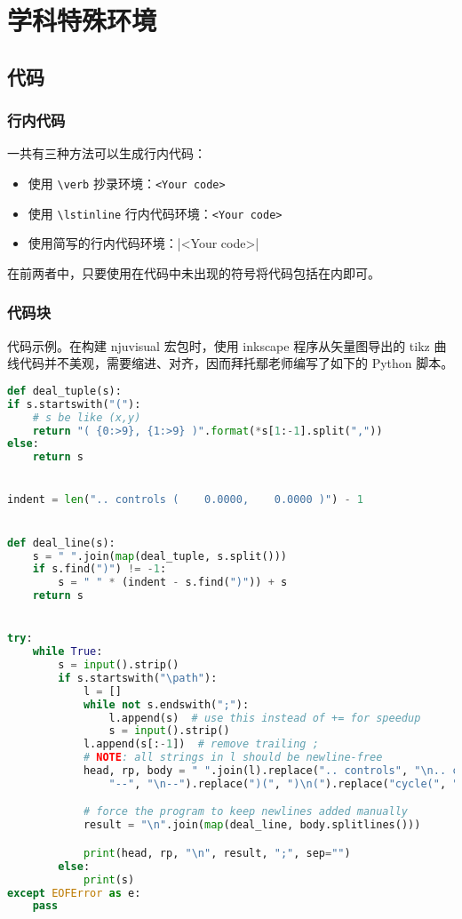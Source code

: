 \chapter{学科特殊环境}

\section{代码}

\subsection{行内代码}

一共有三种方法可以生成行内代码：
\begin{itemize}
    \item 使用 \texttt{\textbackslash verb} 抄录环境：\verb!<Your code>!
    \item 使用 \texttt{\textbackslash lstinline} 行内代码环境：\lstinline[basicstyle=\tt]+<Your code>+
    \item 使用简写的行内代码环境：|<Your code>|
\end{itemize}
在前两者中，只要使用在代码中未出现的符号将代码包括在内即可。

\subsection{代码块}

代码示例。在构建 \textsf{njuvisual} 宏包时，使用 inkscape 程序从矢量图导出的 \textsf{tikz} 曲线代码并不美观，需要缩进、对齐，因而拜托鄢老师编写了如下的 Python 脚本。
\begin{lstlisting}[language=Python,morekeywords={startswith,endswith,split,strip,join,find,append,replace}]
def deal_tuple(s):
if s.startswith("("):
    # s be like (x,y)
    return "( {0:>9}, {1:>9} )".format(*s[1:-1].split(","))
else:
    return s


indent = len(".. controls (    0.0000,    0.0000 )") - 1


def deal_line(s):
    s = " ".join(map(deal_tuple, s.split()))
    if s.find(")") != -1:
        s = " " * (indent - s.find(")")) + s
    return s


try:
    while True:
        s = input().strip()
        if s.startswith("\path"):
            l = []
            while not s.endswith(";"):
                l.append(s)  # use this instead of += for speedup
                s = input().strip()
            l.append(s[:-1])  # remove trailing ;
            # NOTE: all strings in l should be newline-free
            head, rp, body = " ".join(l).replace(".. controls", "\n.. controls").replace(
                "--", "\n--").replace(")(", ")\n(").replace("cycle(", "cycle\n(").partition("]")

            # force the program to keep newlines added manually
            result = "\n".join(map(deal_line, body.splitlines()))

            print(head, rp, "\n", result, ";", sep="")
        else:
            print(s)
except EOFError as e:
    pass
\end{lstlisting}

